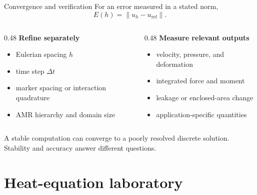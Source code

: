 \documentclass[aspectratio=169,11pt]{beamer}
\begin{document}
\begin{frame}{Convergence and verification}
For an error measured in a stated norm,
\[
  E(h)=\lVert u_h-u_{\mathrm{ref}}\rVert.
\]
\begin{columns}[T,onlytextwidth]
\begin{column}{0.48\textwidth}
\textbf{Refine separately}
\begin{itemize}\itemsep5pt
  \item Eulerian spacing \(h\)
  \item time step \(\Delta t\)
  \item marker spacing or interaction quadrature
  \item AMR hierarchy and domain size
\end{itemize}
\end{column}
\begin{column}{0.48\textwidth}
\textbf{Measure relevant outputs}
\begin{itemize}\itemsep5pt
  \item velocity, pressure, and deformation
  \item integrated force and moment
  \item leakage or enclosed-area change
  \item application-specific quantities
\end{itemize}
\end{column}
\end{columns}
\begin{punchbox}
\small A stable computation can converge to a poorly resolved discrete solution. Stability and accuracy answer different questions.
\end{punchbox}
\end{frame}

\section{Heat-equation laboratory}
\end{document}
